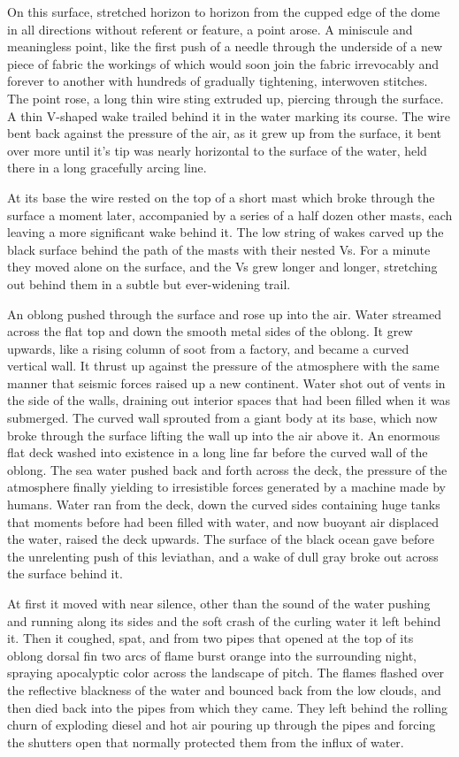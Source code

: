 \documentclass[]{article}
\begin{document}
\begin{multicols}{2}
On this surface, stretched horizon to horizon from the cupped edge of
the dome in all directions without referent or feature, a point arose. A
miniscule and meaningless point, like the first push of a needle through
the underside of a new piece of fabric the workings of which would soon
join the fabric irrevocably and forever to another with hundreds of
gradually tightening, interwoven stitches. The point rose, a long thin
wire sting extruded up, piercing through the surface. A thin V-shaped
wake trailed behind it in the water marking its course. The wire bent
back against the pressure of the air, as it grew up from the surface, it
bent over more until it's tip was nearly horizontal to the surface of
the water, held there in a long gracefully arcing line.

At its base the wire rested on the top of a short mast which broke
through the surface a moment later, accompanied by a series of a half
dozen other masts, each leaving a more significant wake behind it. The
low string of wakes carved up the black surface behind the path of the
masts with their nested Vs. For a minute they moved alone on the
surface, and the Vs grew longer and longer, stretching out behind them
in a subtle but ever-widening trail.

An oblong pushed through the surface and rose up into the air. Water
streamed across the flat top and down the smooth metal sides of the
oblong. It grew upwards, like a rising column of soot from a factory,
and became a curved vertical wall. It thrust up against the pressure of
the atmosphere with the same manner that seismic forces raised up a new
continent. Water shot out of vents in the side of the walls, draining
out interior spaces that had been filled when it was submerged. The
curved wall sprouted from a giant body at its base, which now broke
through the surface lifting the wall up into the air above it. An
enormous flat deck washed into existence in a long line far before the
curved wall of the oblong. The sea water pushed back and forth across
the deck, the pressure of the atmosphere finally yielding to
irresistible forces generated by a machine made by humans. Water ran
from the deck, down the curved sides containing huge tanks that moments
before had been filled with water, and now buoyant air displaced the
water, raised the deck upwards. The surface of the black ocean gave
before the unrelenting push of this leviathan, and a wake of dull gray
broke out across the surface behind it.

At first it moved with near silence, other than the sound of the water
pushing and running along its sides and the soft crash of the curling
water it left behind it. Then it coughed, spat, and from two pipes that
opened at the top of its oblong dorsal fin two arcs of flame burst
orange into the surrounding night, spraying apocalyptic color across the
landscape of pitch. The flames flashed over the reflective blackness of
the water and bounced back from the low clouds, and then died back into
the pipes from which they came. They left behind the rolling churn of
exploding diesel and hot air pouring up through the pipes and forcing
the shutters open that normally protected them from the influx of water.


\end{multicols}
\end{document}
